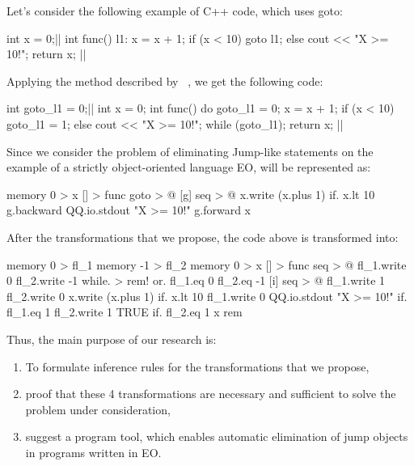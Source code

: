 
Let's consider the following example of C++ code, which uses goto:
\begin{ffcode}
int x = 0;|$\label{ln:cpp0}$|
int func() {
l1:
  x = x + 1;
  if (x < 10)
    goto l1;
  else
    cout << "X >= 10!\n";
  return x;
}|$\label{ln:cpp1}$|
\end{ffcode}
Applying the method described by ~\citet{erosa1994taming}, we get the following code:
\begin{ffcode}
int goto_l1 = 0;|$\label{ln:tcpp0}$|
int x = 0;
int func() {
  do {
    goto_l1 = 0;
    x = x + 1;
    if (x < 10)
      goto_l1 = 1;
    else
      cout << "X >= 10!\n";
  } while (goto_l1);
  return x;
}|$\label{ln:tcpp1}$|
\end{ffcode}

Since we consider the problem of eliminating Jump-like statements on the example of a strictly object-oriented language EO,  will be represented as:
\begin{ffcode}
memory 0 > x
[] > func
  goto > @
    [g]
      seq > @
        x.write (x.plus 1)
        if.
          x.lt 10
          g.backward
          QQ.io.stdout "X >= 10!\n"
        g.forward x
\end{ffcode}
After the transformations that we propose, the code above is transformed into:
\begin{ffcode}
memory 0 > fl_1
memory -1 > fl_2
memory 0 > x
[] > func
  seq > @
    fl_1.write 0
    fl_2.write -1
    while. > rem!
      or.
        fl_1.eq 0
        fl_2.eq -1
      [i]
        seq > @
          fl_1.write 1
          fl_2.write 0
          x.write (x.plus 1)
          if.
            x.lt 10
            fl_1.write 0
            QQ.io.stdout "X >= 10!\n"
          if.
            fl_1.eq 1
            fl_2.write 1
            TRUE
    if.
      fl_2.eq 1
      x
      rem
\end{ffcode}

Thus, the main purpose of our research is:
\begin{enumerate}
    \item To formulate inference rules for the transformations that we propose,
    \item proof that these 4 transformations are necessary and sufficient to solve the problem under consideration,
    \item suggest a program tool, which
    enables automatic elimination of jump objects in programs written in EO.
\end{enumerate}
